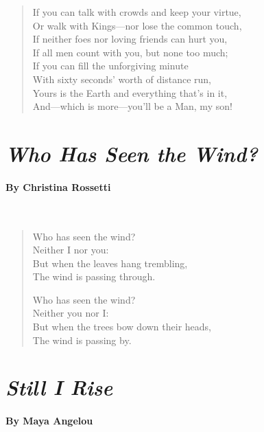 \begin{verse}
	If you can talk with crowds and keep your virtue,\\
	\hspace{0.5em} Or walk with Kings—nor lose the common touch,\\
	If neither foes nor loving friends can hurt you,\\
	\hspace{0.5em} If all men count with you, but none too much;\\
	If you can fill the unforgiving minute\\
	\hspace{0.5em} With sixty seconds’ worth of distance run,\\
	Yours is the Earth and everything that’s in it,\\
	\hspace{0.5em} And—which is more—you’ll be a Man, my son!
\end{verse}

\newpage
\section*{\emph{Who Has Seen the Wind?}}
\paragraph{By Christina Rossetti}~
\begin{verse}
	Who has seen the wind?\\
	Neither I nor you:\\
	But when the leaves hang trembling,\\
	The wind is passing through.

	Who has seen the wind?\\
	Neither you nor I:\\
	But when the trees bow down their heads,\\
	The wind is passing by.
\end{verse}

\newpage
\section*{\emph{Still I Rise}}
\paragraph{By Maya Angelou}~

